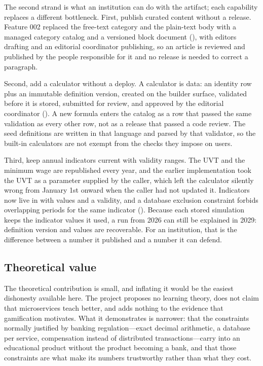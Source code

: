 The second strand is what an institution can do with the artifact; each
capability replaces a different bottleneck. First, publish curated content
without a release. Feature 002 replaced the free-text category and the plain-text
body with a managed category catalog and a versioned block document
(), with
editors drafting and an editorial coordinator publishing, so an article is
reviewed and published by the people responsible for it and no release is needed
to correct a paragraph.

Second, add a calculator without a deploy. A calculator is data: an identity row
plus an immutable definition version, created on the builder surface, validated
before it is stored, submitted for review, and approved by the editorial
coordinator (). A new formula enters the catalog as
a row that passed the same validation as every other row, not as a release that
passed a code review. The seed definitions are written in that language and
parsed by that validator, so the built-in calculators are not exempt from the
checks they impose on users.

Third, keep annual indicators current with validity ranges. The UVT and the
minimum wage are republished every year, and the earlier implementation took the
UVT as a parameter supplied by the caller, which left the calculator silently
wrong from January 1st onward when the caller had not updated it. Indicators now
live in  with  values and a
 validity, and a database exclusion constraint forbids
overlapping periods for the same indicator
(). Because each stored
simulation keeps the indicator values it used, a run from 2026 can still be
explained in 2029: definition version and values are recoverable. For an
institution, that is the difference between a number it published and a number
it can defend.

\subsection{Theoretical value}

The theoretical contribution is small, and inflating it would be the easiest
dishonesty available here. The project proposes no learning theory, does not
claim that microservices teach better, and adds nothing to the evidence that
gamification motivates. What it demonstrates is narrower: that the constraints
normally justified by banking regulation---exact decimal arithmetic, a database
per service, compensation instead of distributed transactions---carry into an
educational product without the product becoming a bank, and that those
constraints are what make its numbers trustworthy rather than what they cost.

